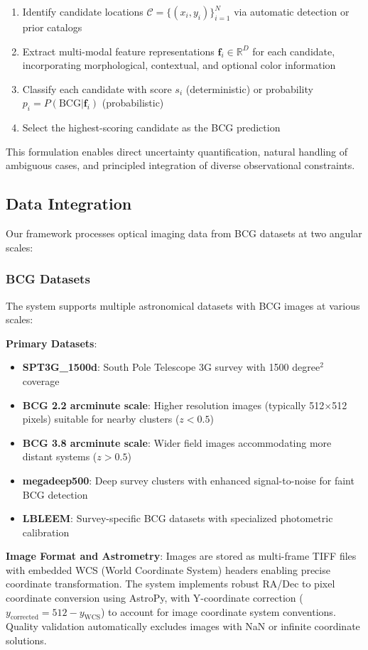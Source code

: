 \documentclass[twocolumn,10pt]{aastex631}
\begin{document}
\begin{enumerate}
\item Identify candidate locations $\mathcal{C} = \{(x_i, y_i)\}_{i=1}^{N}$ via automatic detection or prior catalogs
\item Extract multi-modal feature representations $\mathbf{f}_i \in \mathbb{R}^{D}$ for each candidate, incorporating morphological, contextual, and optional color information
\item Classify each candidate with score $s_i$ (deterministic) or probability $p_i = P(\text{BCG}|\mathbf{f}_i)$ (probabilistic)
\item Select the highest-scoring candidate as the BCG prediction
\end{enumerate}

This formulation enables direct uncertainty quantification, natural handling of ambiguous cases, and principled integration of diverse observational constraints.

\subsection{Data Integration}

Our framework processes optical imaging data from BCG datasets at two angular scales:

\subsubsection{BCG Datasets}
The system supports multiple astronomical datasets with BCG images at various scales:

\textbf{Primary Datasets}:
\begin{itemize}
\item \textbf{SPT3G\_1500d}: South Pole Telescope 3G survey with 1500 degree$^2$ coverage
\item \textbf{BCG 2.2 arcminute scale}: Higher resolution images (typically 512$\times$512 pixels) suitable for nearby clusters ($z < 0.5$)
\item \textbf{BCG 3.8 arcminute scale}: Wider field images accommodating more distant systems ($z > 0.5$)
\item \textbf{megadeep500}: Deep survey clusters with enhanced signal-to-noise for faint BCG detection
\item \textbf{LBLEEM}: Survey-specific BCG datasets with specialized photometric calibration
\end{itemize}

\textbf{Image Format and Astrometry}: Images are stored as multi-frame TIFF files with embedded WCS (World Coordinate System) headers enabling precise coordinate transformation. The system implements robust RA/Dec to pixel coordinate conversion using AstroPy, with Y-coordinate correction ($y_{\text{corrected}} = 512 - y_{\text{WCS}}$) to account for image coordinate system conventions. Quality validation automatically excludes images with NaN or infinite coordinate solutions.
\end{document}
